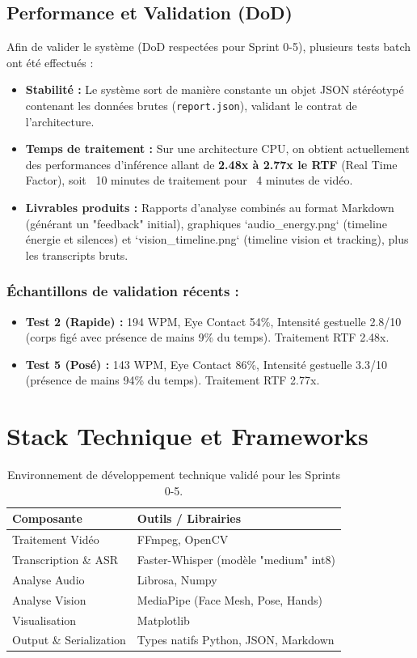 \documentclass[12pt,a4paper]{article}
\begin{document}
\subsection{Performance et Validation (DoD)}
Afin de valider le système (DoD respectées pour Sprint 0-5), plusieurs tests batch ont été effectués :
\begin{itemize}
    \item \textbf{Stabilité :} Le système sort de manière constante un objet JSON stéréotypé contenant les données brutes (\texttt{report.json}), validant le contrat de l'architecture.
    \item \textbf{Temps de traitement :} Sur une architecture CPU, on obtient actuellement des performances d'inférence allant de \textbf{2.48x à 2.77x le RTF} (Real Time Factor), soit ~10 minutes de traitement pour ~4 minutes de vidéo.
    \item \textbf{Livrables produits :} Rapports d'analyse combinés au format Markdown (générant un "feedback" initial), graphiques `audio\_energy.png` (timeline énergie et silences) et `vision\_timeline.png` (timeline vision et tracking), plus les transcripts bruts.
\end{itemize}

\subsubsection*{Échantillons de validation récents :}
\begin{itemize}
    \item \textbf{Test 2 (Rapide) :} 194 WPM, Eye Contact 54\%, Intensité gestuelle 2.8/10 (corps figé avec présence de mains 9\% du temps). Traitement RTF 2.48x.
    \item \textbf{Test 5 (Posé) :} 143 WPM, Eye Contact 86\%, Intensité gestuelle 3.3/10 (présence de mains 94\% du temps). Traitement RTF 2.77x.
\end{itemize}

\section{Stack Technique et Frameworks}
\begin{table}[H]
    \centering
    \begin{tabular}{@{}ll@{}}
        \toprule
        \textbf{Composante} & \textbf{Outils / Librairies} \\
        \midrule
        Traitement Vidéo & FFmpeg, OpenCV \\
        Transcription \& ASR & Faster-Whisper (modèle "medium" int8) \\
        Analyse Audio & Librosa, Numpy \\
        Analyse Vision & MediaPipe (Face Mesh, Pose, Hands) \\
        Visualisation & Matplotlib \\
        Output \& Serialization & Types natifs Python, JSON, Markdown \\
        \bottomrule
    \end{tabular}
    \caption{Environnement de développement technique validé pour les Sprints 0-5.}
\end{table}
\end{document}
